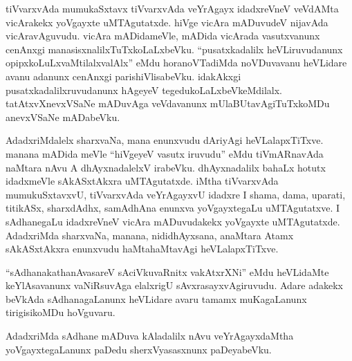 tiVvarxvAda mumukaSxtavx tiVvarxvAda veYrAgayx idadxreVneV veVdAMta vicArakekx yoVgayxte uMTAgutatxde. hiVge vicAra mADuvudeV nijavAda vicAravAguvudu. vicAra mADidameVle, mADida vicArada vasutxvanunx cenAnxgi manasisxnalilxTuTxkoLaLxbeVku. ``pusatxkadalilx heVLiruvudanunx opipxkoLuLxvaMtilalxvalAlx'' eMdu horanoVTadiMda noVDuvavanu heVLidare avanu adanunx cenAnxgi parishiVlisabeVku. idakAkxgi pusatxkadalilxruvudanunx hAgeyeV tegedukoLaLxbeVkeMdilalx. tatAtxvXnevxVSaNe mADuvAga veVdavanunx mUlaBUtavAgiTuTxkoMDu anevxVSaNe mADabeVku.

AdadxriMdalelx sharxvaNa, mana enunxvudu dAriyAgi heVLalapxTiTxve. manana mADida meVle ``hiVgeyeV vasutx iruvudu'' eMdu tiVmARnavAda naMtara nAvu A dhAyxnadalelxV irabeVku. dhAyxnadalilx bahaLx hotutx idadxmeVle sAkASxtAkxra uMTAgutatxde. iMtha tiVvarxvAda mumukuSxtavxvU, tiVvarxvAda veYrAgayxvU idadxre I shama, dama, uparati, titikASx, sharxdAdhx, samAdhAna enunxva yoVgayxtegaLu uMTAgutatxve. I sAdhanegaLu idadxreVneV vicAra mADuvudakekx yoVgayxte uMTAgutatxde. AdadxriMda sharxvaNa, manana, nididhAyxsana, anaMtara Atamx sAkASxtAkxra enunxvudu haMtahaMtavAgi heVLalapxTiTxve.

``sAdhanakathanAvasareV sAciVkuvaRnitx vakAtxrXNi'' eMdu heVLidaMte keYlAsavanunx vaNiRsuvAga elalxrigU sAvxrasayxvAgiruvudu. Adare adakekx beVkAda sAdhanagaLanunx heVLidare avaru tamamx muKagaLanunx tirigisikoMDu hoVguvaru.

AdadxriMda sAdhane mADuva kAladalilx nAvu veYrAgayxdaMtha yoVgayxtegaLanunx paDedu sherxVyasasxnunx paDeyabeVku.














































































